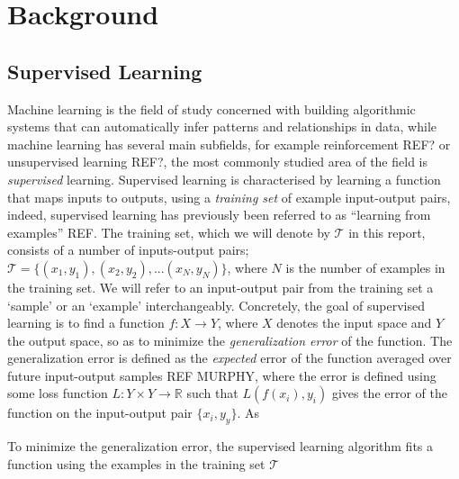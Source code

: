 \chapter{Background}

\section{Supervised Learning}
Machine learning is the field of study concerned with building algorithmic systems that can automatically infer patterns and relationships in data, while machine learning has several main subfields, for example reinforcement REF? or unsupervised learning REF?, the most commonly studied area of the field is \textit{supervised} learning. Supervised learning is characterised by learning a function that maps inputs to outputs, using a \textit{training set} of example input-output pairs, indeed, supervised learning has previously been referred to as ``learning from examples'' REF. The training set, which we will denote by $\mathcal{T}$ in this report, consists of a number of inputs-output pairs; $\mathcal{T} = \{(x_1,y_1),(x_2,y_2),...(x_N,y_N)\}$, where $N$ is the number of examples in the training set. We will refer to an input-output pair from the training set a `sample' or an `example' interchangeably. Concretely, the goal of supervised learning is to find a function $f : X \rightarrow Y$, where $X$ denotes the input space and $Y$ the output space, so as to minimize the \textit{generalization error} of the function. The generalization error is defined as the \textit{expected} error of the function averaged over future input-output samples REF MURPHY, where the error is defined using some loss function $L:Y \times Y \rightarrow \mathbb{R}$ such that $L(f(x_i),y_i)$ gives the error of the function on the input-output pair $\{x_i,y_y\}$. As 

To minimize the generalization error, the supervised learning algorithm fits a function using the examples in the training set $\mathcal{T}$

